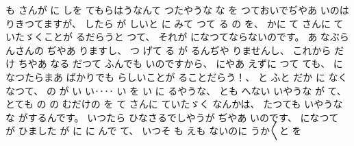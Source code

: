 %
も
さんが
に
しを
てもらはうなんて
つたやうな
な
を
つておいでぢやあ
いのは
りきつてますが、
%
したら
が
しいと
に
みて
つて
る
の
を、
%
かに
て
さんに
ていたゞくことが
るだらうと
つて、
%
それが
になつてならないのです。
%
あ
なぶらんさんの
ぢやあ
りますし、
%
つ
げて
る
が
るんぢや
りませんし、
%
これから
だけ
ちやあ
なる
だつて
ふんでも
いのですから、
%
にやあ
えずに
つて
ても、
%
になつたらまあ
ばかりでも
らしいことが
ることだらう！、
%
と
ふと
だか
に
なくなつて、
%
の
が
い
い‥‥
い
を
い
に
るやうな、
%
とも
へない
いやうな
が
て、
%
とても
の
の
むだけの
を
て
さんに
ていたゞく
なんかは、
%
たつても
いやうな
な
がするんです。
%
いつたら
ひなさるでしやうが
ぢやあ
いのです、
%
になつて
が
ひました
が
に
に
んで
て、
%
いつそ
も
えも
ないのに
うか〳〵と
を
